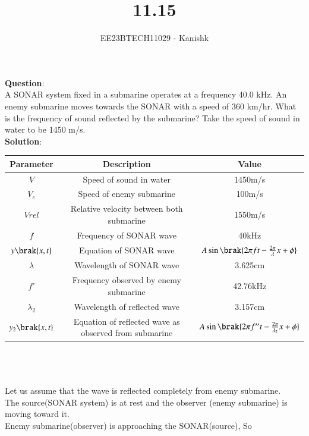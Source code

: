 \documentclass[journal,12pt,onecolumn]{IEEEtran}
\theoremstyle{remark}
\begin{document}

\vspace{3cm}

\title{11.15}
\author{EE23BTECH11029 - Kanishk}
\maketitle

\bigskip

\renewcommand{\thefigure}{\theenumi}
\renewcommand{\thetable}{\theenumi}
\footnotesize
\textbf{Question}:\\ 

A SONAR system fixed in a submarine operates at a frequency 40.0 kHz. An enemy submarine moves towards the SONAR with a speed of 360 km/hr. What is the frequency of sound reflected by the submarine? Take the speed of sound in water to be 1450 m/s.\\

\textbf{Solution}:\\


\begin{tabular}{|c|c|c|}
   
   \hline
   Parameter & Description & Value\\
   \hline
   $V $& Speed of sound in water & 1450m/s\\
   \hline 
   $V_e$ & Speed of enemy submarine & 100m/s\\
   \hline 
   $Vrel$ & Relative velocity between both submarine & 1550m/s\\
   \hline
   $f $& Frequency of SONAR wave & 40kHz\\ 
   \hline
   $y\brak{x,t}$ & Equation of SONAR wave & $A\sin\brak{2\pi ft-\frac{2\pi}{\lambda}x+\phi}$\\
   \hline
   $\lambda$ & Wavelength of SONAR wave & 3.625cm\\
    \hline
   $ f' $& Frequency observed by enemy submarine & 42.76kHz\\
   \hline
   $\lambda_2$ & Wavelength of reflected wave & 3.157cm\\
   \hline 
  $ y_2\brak{x,t}$ & Equation of reflected wave as observed from submarine& $A\sin\brak{2\pi f''t-\frac{2\pi}{\lambda_2}x+\phi}$\\
   \hline
   
\end{tabular}   
\\
\\
\\
Let us assume that the wave is reflected completely from enemy submarine.\\
The source(SONAR system) is at rest and the observer (enemy submarine) is moving toward it. \\
Enemy submarine(observer) is approaching the SONAR(source), So 
\end{document}
